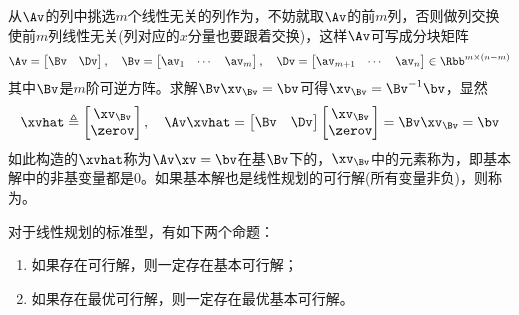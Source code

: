 \documentclass{ctexart}
\begin{document}
从$\Av$的列中挑选$m$个线性无关的列作为，不妨就取$\Av$的前$m$列，否则做列交换使前$m$列线性无关(列对应的$x$分量也要跟着交换)，这样$\Av$可写成分块矩阵
\begin{align*}
    \Av = \begin{bmatrix} \Bv & \Dv \end{bmatrix}, \quad \Bv =
    \begin{bmatrix}
        \av_1 & \cdots & \av_m
    \end{bmatrix}, \quad \Dv =
    \begin{bmatrix}
        \av_{m+1} & \cdots & \av_n
    \end{bmatrix} \in \Rbb^{m \times (n-m)}
\end{align*}
其中$\Bv$是$m$阶可逆方阵。求解$\Bv \xv_\Bv = \bv$可得$\xv_\Bv = \Bv^{-1} \bv$，显然
\begin{align*}
    \xvhat \triangleq \begin{bmatrix} \xv_\Bv \\ \zerov \end{bmatrix}, \quad \Av \xvhat = \begin{bmatrix} \Bv & \Dv \end{bmatrix} \begin{bmatrix} \xv_\Bv \\ \zerov \end{bmatrix} = \Bv \xv_\Bv = \bv
\end{align*}
如此构造的$\xvhat$称为$\Av \xv = \bv$在基$\Bv$下的，$\xv_\Bv$中的元素称为，即基本解中的非基变量都是$0$。如果基本解也是线性规划的可行解(所有变量非负)，则称为。

\begin{theorem} [线性规划基本定理]
    对于线性规划的标准型，有如下两个命题：
    \begin{enumerate}
        \item 如果存在可行解，则一定存在基本可行解；
        \item 如果存在最优可行解，则一定存在最优基本可行解。
    \end{enumerate}
\end{theorem}
\end{document}
